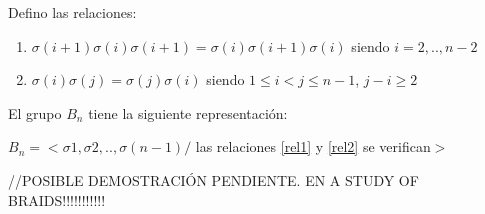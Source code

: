 \documentclass[14pt]{extarticle}
\begin{document}
	\begin{teo}	    
	    Defino las relaciones:
	    \begin{enumerate}
	    	\item $ \sigma(i+1)\sigma(i)\sigma(i+1) =\sigma(i)\sigma(i+1)\sigma(i) $ siendo $i=2,..,n-2 $ \label{rel1}
	    	\item $ \sigma(i)\sigma(j)=\sigma(j)\sigma(i) $ siendo $1 \le i < j \le n-1 $, $j-i \geq 2$	 \label{rel2}   	
	    \end{enumerate}
	    El grupo $B_{n}$ tiene la siguiente representación:
        \begin{center}
			$B_{n} = <\sigma1, \sigma2,..,\sigma(n-1) /$ las relaciones \ref{rel1} y \ref{rel2} se verifican$>$
        \end{center}
	   
	\end{teo}
	//POSIBLE DEMOSTRACIÓN PENDIENTE. EN A STUDY OF BRAIDS!!!!!!!!!!!\\
	
\end{document}
